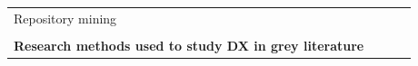 \documentclass[english, 12pt, a4paper, sci, utf8, a-1b, online]{aaltothesis}
\begin{document}
\begin{center}
\begin{longtable}{p{0.3\linewidth}p{0.6\linewidth}}
    Repository mining                            & \textcite{fontao2017facing} \newline \textcite{de2017towards} \newline \textcite{claussen2019role}                                                                                                                                                                                                                                                                                                                                                                                                                                                                                                                                                                                                                                                                                                                                                                                                                                                 \\
                                                 &                                                                                                                                                                                                                                                                                                                                                                                                                                                                                                                                                                                                                                                                                                                                                                                                                                                                                                                                                    \\
    \multicolumn{2}{l}{\textbf{Research methods used to study DX in grey literature}}                                                                                                                                                                                                                                                                                                                                                                                                                                                                                                                                                                                                                                                                                                                                                                                                                                                                                                                                                      \\

\end{longtable}
\end{center}
\end{document}
